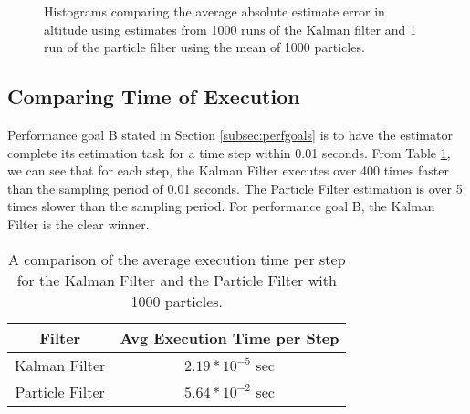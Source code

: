 \begin{figure}
  \caption{Histograms comparing the average absolute estimate error in
    altitude using estimates from 1000 runs of the Kalman filter and 1 run of
    the particle filter using the mean of 1000 particles.}
  \label{fig:kfpfcompare}
\end{figure}

\subsection{Comparing Time of Execution}

Performance goal B stated in Section \ref{subsec:perfgoals} is to have
the estimator complete its estimation task for a time step within 0.01
seconds. From Table \ref{table:time}, we can see that for each step,
the Kalman Filter executes over 400 times faster than the sampling
period of 0.01 seconds. The Particle Filter estimation is over
5 times slower than the sampling period. For performance goal B, the
Kalman Filter is the clear winner.

\begin{table}[h]
\centering %
\begin{tabular}{c|c} %
  \hline \hline
  Filter & Avg Execution Time per Step \\
  \hline 
Kalman Filter & $2.19*10^{-5}$ sec \\
\hline 
Particle Filter & $5.64*10^{-2}$ sec \\
\hline %
\end{tabular}
\caption{A comparison of the average execution time per step for the
  Kalman Filter and the Particle Filter with 1000 particles.} %
\label{table:time} %
\end{table}
